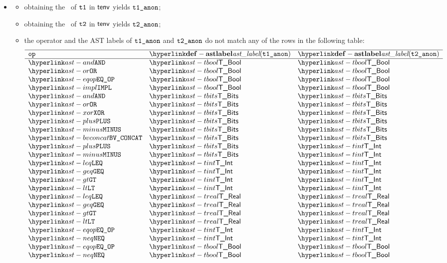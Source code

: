 \begin{itemize}
  \item {}
  \begin{itemize}
    \item obtaining the \underlyingtype\ of $\texttt{t1}$ in $\textsf{tenv}$ yields $\texttt{t1\_anon}$\ProseOrTypeError;
    \item obtaining the \underlyingtype\ of $\texttt{t2}$ in $\textsf{tenv}$ yields $\texttt{t2\_anon}$\ProseOrTypeError;
    \item the operator and the AST labels of $\texttt{t1\_anon}$ and $\texttt{t2\_anon}$ do not match any of the rows in the following table:
    \[
    \begin{array}{lll}
      \hline
      \mathbf{\op} & \mathbf{\astlabel(\vtoneanon)} & \mathbf{\astlabel(\vttwoanon)} \\
      \hline
      \AND     & \TBool  & \TBool\\
      \OR      & \TBool  & \TBool\\
      \EQOP    & \TBool  & \TBool\\
      \IMPL    & \TBool  & \TBool\\
      \AND     & \TBits  & \TBits\\
      \OR      & \TBits  & \TBits\\
      \XOR     & \TBits  & \TBits\\
      \PLUS    & \TBits  & \TBits\\
      \MINUS   & \TBits  & \TBits\\
      \BVCONCAT & \TBits  & \TBits\\
      \PLUS    & \TBits  & \TInt\\
      \MINUS   & \TBits  & \TInt\\
      \LEQ     & \TInt     & \TInt\\
      \GEQ     & \TInt     & \TInt\\
      \GT      & \TInt     & \TInt\\
      \LT      & \TInt     & \TInt\\
      \LEQ     & \TReal    & \TReal\\
      \GEQ     & \TReal    & \TReal\\
      \GT      & \TReal    & \TReal\\
      \LT      & \TReal    & \TReal\\
      \EQOP    & \TInt     & \TInt\\
      \NEQ     & \TInt     & \TInt\\
      \EQOP    & \TBool    & \TBool\\
      \NEQ     & \TBool    & \TBool\\

\end{array}\]
\end{itemize}
\end{itemize}
